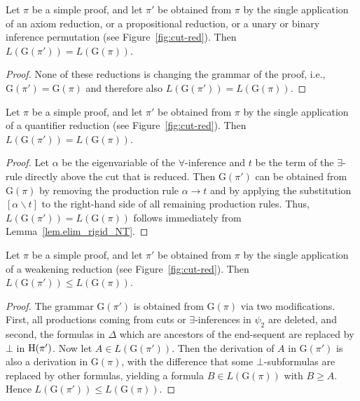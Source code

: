 \documentclass{LMCS}
\theoremstyle{plain}
\theoremstyle{definition}
\newcommand{\sop}{[}
\newcommand{\scl}{]}
\newcommand{\sel}[2]{#1 \backslash #2}
\newcommand{\unsubst}[2]{\sop \sel{#1}{#2} \scl}
\newcommand{\Lang}[1]{L(#1)}	\newcommand{\Gram}[1]{\mathrm{G}(#1)}	\newcommand{\Gramreg}[1]{\mathrm{G}_0(#1)}
\newcommand{\Hsub}{\le}
\newcommand{\Hsup}{\ge}
\begin{document}
\begin{lem}\label{lem:H-invar}
  Let $\pi$ be a simple proof, and let $\pi'$ be
  obtained from $\pi$ by the single application of an axiom reduction,
  or a propositional reduction, or a unary or binary inference
  permutation (see Figure~\ref{fig:cut-red}). Then
  $\Lang{\Gram{\pi'}}=\Lang{\Gram{\pi}}$.
\end{lem}

\begin{proof}
  None of these reductions is changing the grammar of the proof, i.e.,
  $\Gram{\pi'}=\Gram{\pi}$ and therefore also
  $\Lang{\Gram{\pi'}}=\Lang{\Gram{\pi}}$.
\end{proof}

\begin{lem}\label{lem:H-invar-quant}
  Let $\pi$ be a simple proof, and let $\pi'$ be
  obtained from $\pi$ by the single application of a quantifier
  reduction (see Figure~\ref{fig:cut-red}). Then
  $\Lang{\Gram{\pi'}}=\Lang{\Gram{\pi}}$.
\end{lem}

\begin{proof}
  Let $\alpha$ be the eigenvariable of the $\forall$-inference and $t$ be
  the term of the $\exists$-rule directly above the cut that is
  reduced. Then $\Gram{\pi'}$ can be obtained from $\Gram{\pi}$ by
  removing the production rule $\alpha\to t$ and by applying the
  substitution $\unsubst{\alpha}{t}$ to the right-hand side of all remaining
  production rules. Thus, $\Lang{\Gram{\pi'}}=\Lang{\Gram{\pi}}$
  follows immediately from Lemma~\ref{lem.elim_rigid_NT}.
\end{proof}


\begin{lem}\label{lem:H-invar-weak}
    Let $\pi$ be a simple proof, and let $\pi'$ be
    obtained from $\pi$ by the single application of a weakening
    reduction (see Figure~\ref{fig:cut-red}). Then
    $\Lang{\Gram{\pi'}}\Hsub\Lang{\Gram{\pi}}$.
\end{lem}

\begin{proof}
  The grammar $\Gram{\pi'}$ is obtained from $\Gram{\pi}$ via two
  modifications. First, all productions coming from cuts or $\exists$-inferences in $\psi_2$
  are deleted, and second, the formulas in $\Delta$ which are ancestors of the end-sequent
  are replaced by $\bot$ in $\mathrm{H}(\pi')$.
  Now let $A\in\Lang{\Gram{\pi'}}$. Then the derivation of $A$ in
  $\Gram{\pi'}$ is also a derivation in $\Gram{\pi}$, with the
  difference that some $\bot$-subformulas are replaced by other
  formulas, yielding a formula $B\in\Lang{\Gram{\pi}}$ with $B\Hsup
  A$. Hence $\Lang{\Gram{\pi'}}\Hsub\Lang{\Gram{\pi}}$.
\end{proof}
\end{document}
